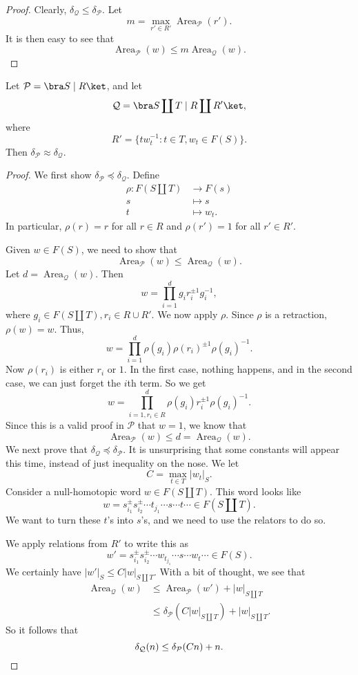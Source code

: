 \documentclass[a4paper]{article}
\DeclareMathOperator\Area{Area}
\begin{document}
\begin{proof}
  Clearly, $\delta_{\mathcal{Q}} \leq \delta_{\mathcal{P}}$. Let
  \[
    m= \max_{r' \in R'} \Area_{\mathcal{P}}(r').
  \]
  It is then easy to see that
  \[
    \Area_{\mathcal{P}}(w) \leq m \Area_{\mathcal{Q}}(w).
  \]
\end{proof}

\begin{lemma}
  Let $\mathcal{P} = \bra S \mid R\ket$, and let
  \[
    \mathcal{Q} = \bra S \coprod T \mid R \coprod R'\ket,
  \]
  where
  \[
    R' = \{t w_t^{-1}: t \in T, w_t \in F(S)\}.
  \]
  Then $\delta_{\mathcal{P}} \approx \delta_{\mathcal{Q}}$.
\end{lemma}

\begin{proof}
  We first show $\delta_{\mathcal{P}} \preccurlyeq \delta_{\mathcal{Q}}$. Define
  \begin{align*}
    \rho: F(S \coprod T) & \to F(s)\\
    s &\mapsto s\\
    t &\mapsto w_t.
  \end{align*}
  In particular, $\rho(r) = r$ for all $r \in R$ and $\rho(r') = 1$ for all $r' \in R'$.

  Given $w \in F(S)$, we need to show that
  \[
    \Area_{\mathcal{P}}(w) \leq \Area_{\mathcal{Q}}(w).
  \]
  Let $d = \Area_\mathcal{Q} (w)$. Then
  \[
    w = \prod_{i = 1}^d g_i r_i^{\pm 1} g_i^{-1},
  \]
  where $g_i \in F(S \coprod T), r_i \in R \cup R'$. We now apply $\rho$. Since $\rho$ is a retraction, $\rho(w) = w$. Thus,
  \[
    w = \prod_{i = 1}^d \rho(g_i) \rho(r_i)^{\pm 1} \rho(g_i)^{-1}.
  \]
  Now $\rho(r_i)$ is either $r_i$ or $1$. In the first case, nothing happens, and in the second case, we can just forget the $i$th term. So we get
  \[
    w = \prod_{i = 1, r_i \in R}^d\rho(g_i) r_i^{\pm 1} \rho(g_i)^{-1}.
  \]
  Since this is a valid proof in $\mathcal{P}$ that $w = 1$, we know that
  \[
    \Area_{\mathcal{P}}(w) \leq d = \Area_{\mathcal{Q}}(w).
  \]
  We next prove that $\delta_{\mathcal{Q}} \preccurlyeq \delta_{\mathcal{P}}$. It is unsurprising that some constants will appear this time, instead of just inequality on the nose. We let
  \[
    C = \max_{t \in T} |w_t|_S.
  \]
  Consider a null-homotopic word $w \in F(S \amalg T)$. This word looks like
  \[
    w = s_{i_1}^{\pm} s_{i_2}^{\pm } \cdots t_{j_1} \cdots s \cdots t \cdots \in F(S \amalg T).
  \]
  We want to turn these $t$'s into $s$'s, and we need to use the relators to do so.

  We apply relations from $R'$ to write this as
  \[
    w' = s_{i_1}^{\pm} s_{i_2}^{\pm } \cdots w_{t_{j_1}} \cdots s \cdots w_t \cdots \in F(S).
  \]
  We certainly have $|w'|_S \leq C |w|_{S \amalg T}$. With a bit of thought, we see that
  \begin{align*}
    \Area_{\mathcal{Q}}(w) &\leq \Area_{\mathcal{P}}(w') + |w|_{S \amalg T}\\
    &\leq \delta_{\mathcal{P}}(C|w|_{S \amalg T} ) + |w|_{S \amalg T}.
  \end{align*}
  So it follows that
  \[
    \delta_{\mathcal{Q}}(n) \leq \delta_{\mathcal{P}}(Cn) + n.\qedhere
  \]
\end{proof}
\end{document}
